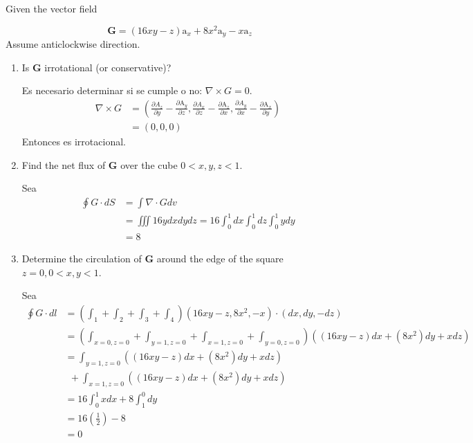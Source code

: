 \begin{problema}

Given the vector field

$$
\mathbf{G}=(16 x y-z) \mathrm{a}_{x}+8 x^{2} \mathrm{a}_{y}-x \mathrm{a}_{z}
$$
Assume anticlockwise direction.

\begin{enumerate}
    \item Is $\mathbf{G}$ irrotational (or conservative)?
        \begin{sol}
            Es necesario determinar si se cumple o no: $\nabla \times G=0$.
            \begin{align*}
                \nabla \times G &= \left(\frac{\partial A_z}{\partial y}-\frac{\partial \mathrm{A}_y}{\partial z},\frac{\partial A_x}{\partial z}-\frac{\partial \mathrm{A}_z}{\partial x},
                \frac{\partial A_y}{\partial x}-\frac{\partial \mathrm{A}_x}{\partial y}\right)\\
                &=(0,0,0)
            \end{align*}
            Entonces es irrotacional.
        \end{sol}
    \item Find the net flux of $\mathbf{G}$ over the cube $0<x, y, z<1$.
    \begin{sol}
        Sea 
        \begin{align*}
            \oint G \cdot d S&=\int \nabla \cdot G d v\\
            &= \iiint 16 y d x d y d z=16 \int_0^1 d x \int_0^1 d z \int_0^1 y d y\\
            &= 8
        \end{align*}
        
    \end{sol}
    
    \item Determine the circulation of $\mathbf{G}$ around the edge of the square $z=0,0<x, y<1$.
    \begin{sol}
        Sea
        \begin{align*}
            \oint G\cdot dl &=\left(\int_1 +\int_2 +\int_3 +\int_4\right)(16xy-z,8x^2,-x)\cdot (dx,dy,-dz)\\
            &=\left(\int_{x=0,z=0} +\int_{y=1,z=0} +\int_{x=1,z=0} +\int_{y=0,z=0}\right)((16xy-z)dx+(8x^2)dy+xdz)\\
            &=\int_{y=1,z=0}((16xy-z)dx+(8x^2)dy+xdz)\\ & \ \ +\int_{x=1,z=0}((16xy-z)dx+(8x^2)dy+xdz)\\
            &= 16\int_0^1 xdx+8\int_1^0 dy\\
            &= 16\left(\frac{1}{2}\right)-8\\
            &= 0
        \end{align*}
    \end{sol}
\end{enumerate}



\end{problema}
%
%

